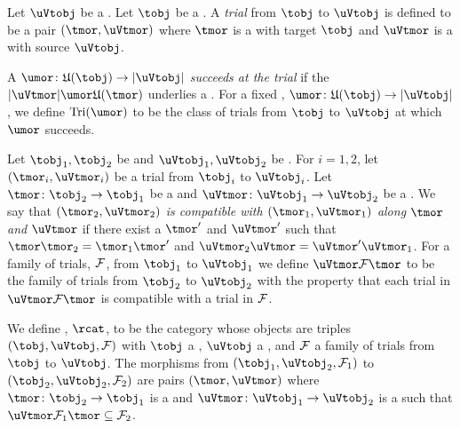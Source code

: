 \documentclass[%
12pt,%
arxiv,%
defaults
]{myclass}
\begin{document}
\begin{defn}
Let \(\uVtobj\) be a \uVtobj.
Let \(\tobj\) be a \tobj.
A \emph{trial} from \(\tobj\) to \(\uVtobj\) is defined to be a pair \(\trial{}\) where \(\tmor\) is a \tmor with target \(\tobj\) and \(\uVtmor\) is a \uVtmor with source \(\uVtobj\).

A \umor \(\umor \colon \ufunc(\tobj) \to \abs{\uVtobj}\) \emph{succeeds at the trial} if the \umor \(\trial{\umor}\) underlies a \uVtmor.
For a fixed \umor, \(\umor \colon \ufunc(\tobj) \to \abs{\uVtobj}\), we define \(\trials{\umor}\) to be the class of trials from \(\tobj\) to \(\uVtobj\) at which \(\umor\) succeeds.

Let \(\tobj_1, \tobj_2\) be \tobjs and \(\uVtobj_1, \uVtobj_2\) be \uVtobjs.
For \(i = 1,2\), let \(\trial[_i]{}\) be a trial from \(\tobj_i\) to \(\uVtobj_i\).
Let \(\tmor \colon \tobj_2 \to \tobj_1\) be a \tmor and \(\uVtmor \colon \uVtobj_1 \to \uVtobj_2\) be a \uVtmor.
We say that \emph{\(\trial[_2]{}\) is compatible with \(\trial[_1]{}\) along \(\tmor\) and \(\uVtmor\)} if there exist a \tmor \(\tmor'\) and \uVtmor \(\uVtmor'\) such that \(\tmor \tmor_2 = \tmor_1 \tmor'\) and \(\uVtmor_2 \uVtmor = \uVtmor' \uVtmor_1\).
For a family of trials, \(\mathcal{F}\), from \(\tobj_1\) to \(\uVtobj_1\) we define \(\uVtmor \m{F} \tmor\) to be the family of trials from \(\tobj_2\) to \(\uVtobj_2\) with the property that each trial in \(\uVtmor \m{F} \tmor\) is compatible with a trial in \(\mathcal{F}\).

We define \rcat, \(\rcat\), to be the category whose objects are triples \((\tobj, \uVtobj, \m{F})\) with \(\tobj\) a \tobj, \(\uVtobj\) a \uVtobj, and \(\mathcal{F}\) a family of trials from \(\tobj\) to \(\uVtobj\).
The morphisms from \((\tobj_1, \uVtobj_2, \m{F}_1)\) to \((\tobj_2, \uVtobj_2, \m{F}_2)\) are pairs \((\tmor, \uVtmor)\) where \(\tmor \colon \tobj_2 \to \tobj_1\) is a \tmor and \(\uVtmor \colon \uVtobj_1 \to \uVtobj_2\) is a \uVtmor such that \(\uVtmor \m{F}_1 \tmor \subseteq \m{F}_2\).
\end{defn}
\end{document}

